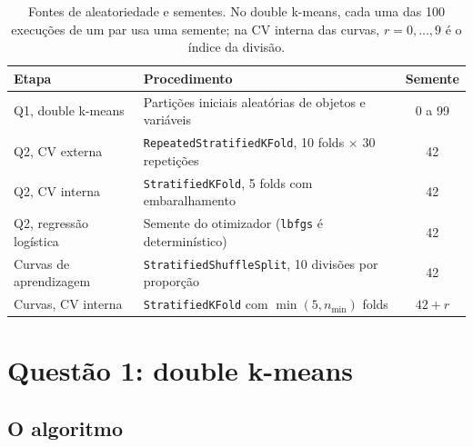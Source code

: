 \documentclass[11pt,a4paper]{article}
\begin{document}
\begin{table}[H]
\centering
\caption{Fontes de aleatoriedade e sementes. No double k-means, cada uma das 100 execuções de um par usa uma
semente; na CV interna das curvas, $r=0,\dots,9$ é o índice da divisão.}\label{tab:sementes}
\small
\begin{tabularx}{\linewidth}{@{}l L c@{}}
\toprule
Etapa & Procedimento & Semente \\
\midrule
Q1, double k-means & Partições iniciais aleatórias de objetos e variáveis & 0 a 99 \\
Q2, CV externa & \texttt{RepeatedStratifiedKFold}, 10 folds $\times$ 30 repetições & 42 \\
Q2, CV interna & \texttt{StratifiedKFold}, 5 folds com embaralhamento & 42 \\
Q2, regressão logística & Semente do otimizador (\texttt{lbfgs} é determinístico) & 42 \\
Curvas de aprendizagem & \texttt{StratifiedShuffleSplit}, 10 divisões por proporção & 42 \\
Curvas, CV interna & \texttt{StratifiedKFold} com $\min(5, n_{\min})$ folds & $42+r$ \\
\bottomrule
\end{tabularx}
\end{table}

\section{Questão 1: double k-means}\label{sec:q1}

\subsection{O algoritmo}
\end{document}
